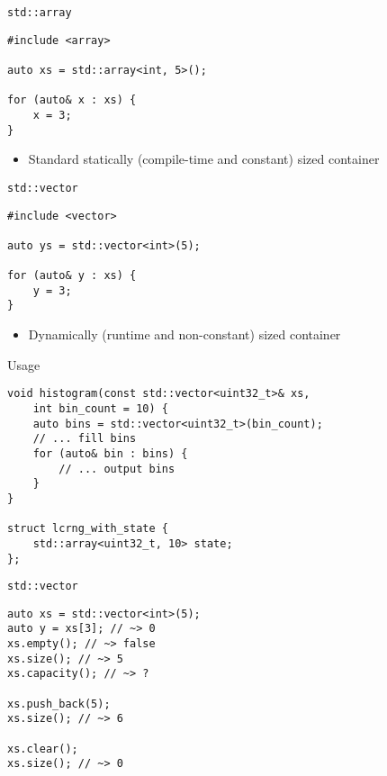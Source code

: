 \documentclass[10pt]{beamer}
\begin{document}
\begin{frame}[fragile,label={sec:org48994e4}]{\texttt{std::array}}
 \begin{verbatim}
#include <array>

auto xs = std::array<int, 5>();

for (auto& x : xs) {
    x = 3;
}
\end{verbatim}
\begin{itemize}
\item Standard statically (compile-time and constant) sized container
\end{itemize}
\end{frame}

\begin{frame}[fragile,label={sec:org3dbcc02}]{\texttt{std::vector}}
 \begin{verbatim}
#include <vector>

auto ys = std::vector<int>(5);

for (auto& y : xs) {
    y = 3;
}
\end{verbatim}

\begin{itemize}
\item Dynamically (runtime and non-constant) sized container
\end{itemize}
\end{frame}

\begin{frame}[fragile,label={sec:org6337afd}]{Usage}
 \begin{verbatim}
void histogram(const std::vector<uint32_t>& xs,
    int bin_count = 10) {
    auto bins = std::vector<uint32_t>(bin_count);
    // ... fill bins
    for (auto& bin : bins) {
        // ... output bins
    }
}

struct lcrng_with_state {
    std::array<uint32_t, 10> state;
};
\end{verbatim}
\end{frame}

\begin{frame}[fragile,label={sec:org8b99dcb}]{\texttt{std::vector}}
 \begin{verbatim}
auto xs = std::vector<int>(5);
auto y = xs[3]; // ~> 0
xs.empty(); // ~> false
xs.size(); // ~> 5
xs.capacity(); // ~> ?

xs.push_back(5);
xs.size(); // ~> 6

xs.clear();
xs.size(); // ~> 0
\end{verbatim}
\end{frame}
\end{document}
